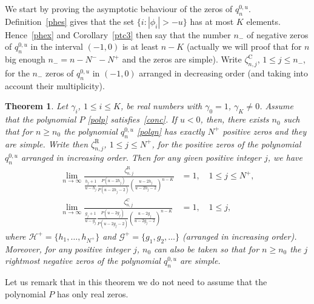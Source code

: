 \documentclass[10pt, a4paper, leqno]{amsart}
\numberwithin{equation}{section}
\theoremstyle{plain}
\newtheorem{Theo}{Theorem}[section]
\theoremstyle{remark}
\newcommand{\Hh}{\mathcal{H}}
\newcommand{\Gg}{\mathcal{G}}
\newcommand{\C}{\mathrm{C}}
\newcommand{\R}{\mathrm{R}}
\begin{document}
We start by proving the asymptotic behaviour of the zeros of $q_n^{0,u}$.
Definition~\eqref{phes} gives that the set $\{i: |\phi_i|>-u\}$ has at most $K$ elements. Hence~\eqref{phex} and Corollary~\ref{ptc3} then say that the number $n_-$ of negative zeros of $q_n^{0,u}$ in the interval $(-1,0)$ is at least $n-K$ (actually we will proof that for $n$ big enough $n_- = n-N^- - N^+$ and the zeros are simple). Write $\zeta^{\C}_{n,j}$, $1\le j\le n_-$, for the $n_-$ zeros of $q_n^{0,u}$ in $(-1,0)$ arranged in decreasing order (and taking into account their multiplicity).

\begin{Theo}
\label{onl3}
Let $\gamma_i$, $1\le i\le K$, be real numbers with $\gamma_0=1$, $\gamma_K \ne 0$. Assume that the polynomial $P$ \eqref{polp} satisfies~\eqref{conc}. If $u<0$, then, there exists $n_0$ such that for $n\ge n_0$ the polynomial $q_n^{0,u}$ \eqref{polqn} has exactly $N^+$ positive zeros and they are simple. Write then $\zeta^{\R}_{n,j}$, $1\le j\le N^+$, for the positive zeros of the polynomial $q_n^{0,u}$
arranged in increasing order.
Then for any given positive integer $j$, we have
\begin{align*}
  \lim_{n\to \infty}\frac{\zeta^{\R}_{n,j}}{\frac{h_j+1}{u-h_j}\frac{P(u-2h_j)}{P(u-2h_j-2)}
  \left(\frac{u-2h_j}{u-2h_j-2}\right)^{n-K}} &= 1, \quad 1\le j\le N^+,
  \\
  \lim_{n\to \infty} \frac{\zeta^{\C}_{n,j}}{\frac{g_j+1}{u-g_j} \frac{P(u-2g_j)}{P(u-2g_j-2)}
  \left(\frac{u-2g_j}{u-2g_j-2}\right)^{n-K}} &= 1, \quad 1\le j,
\end{align*}
where $\Hh^+=\{h_1,\dots, h_{N^+}\}$ and $\Gg^+ = \{g_1,g_2,\dots\}$ (arranged in increasing order).
Moreover, for any positive integer $j$, $n_0$ can also be taken so that for $n\ge n_0$ the $j$ rightmost negative zeros of the polynomial $q_n^{0,u}$ are simple.
\end{Theo}

Let us remark that in this theorem we do not need to assume that the polynomial $P$ has only real zeros.
\end{document}
